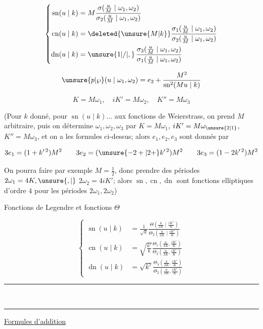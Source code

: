 \[
\left\{\begin{aligned}
\operatorname{sn}(u\mid k)&=M\frac{\sigma(\frac uM\mid\omega_1,\omega_2)}{\sigma_2(\frac uM\mid\omega_1,\omega_2)}\\
\operatorname{cn}(u\mid k)&=\deleted{\unsure{M|k}}\frac{\sigma_1(\frac uM\mid\omega_1,\omega_2)}{\sigma_2(\frac uM\mid\omega_1,\omega_2)}\\
\operatorname{dn}(u\mid k)&=\unsure{1|/|,}\,\frac{\sigma_3(\frac uM\mid\omega_1,\omega_2)}{\sigma_1(\frac uM\mid\omega_1,\omega_2)}
\end{aligned}\right.
\]

\[
\unsure{p|\wp}(u\mid\omega_1,\omega_2)=e_2+\frac{M^2}{\operatorname{sn}^2(Mu\mid k)}
\]

\[
K=M\omega_1,\quad iK'=M\omega_2,\quad K''=M\omega_3
\]

(Pour $k$ donné, pour  $\operatorname{sn}(u\mid k)\ldots$ aux fonctions de Weierstrass, on prend $M$ arbitraire, puis on détermine $\omega_1,\omega_2,\omega_3$ par $K=M\omega_1$, $iK'=M\omega_{\unsure{2|1}}$, $K''=M\omega_3$, et on a les formules ci-dessus;  alors $e_1,e_2,e_3$ sont donnés par

\[
3e_1=(1+k'^{\,2})M^2\qquad
3e_2=(\unsure{-2+|2+}k'^{\,2})M^2\qquad
3e_3=(1-2k'^{\,2})M^2
\]

On pourra faire par exemple $M=\frac12$, donc prendre des périodes  $2\omega_1=4K,\unsure{,|{}}$ $2\omega_2=4iK'$; alors $\operatorname{sn},\operatorname{cn},\operatorname{dn}$ sont fonctions elliptiques d'ordre $4$ pour les périodes $2\omega_1,2\omega_2$)

Fonctions de Legendre et fonctions $\Theta$

\[
\left\{\begin{aligned}
\operatorname{sn}(u\mid k)&=\frac1{\sqrt k}\frac{\Theta(\frac{u}{2K}\mid\frac{iK'}K)}{\Theta_2(\frac{u}{2K}\mid\frac{iK'}K)}\\
\operatorname{cn}(u\mid k)&=\sqrt{\frac{k'}k}\frac{\Theta_1(\frac{u}{2K},\frac{iK'}K)}{\Theta_2(\frac{u}{2K},\frac{iK'}K)}\\
\operatorname{dn}(u\mid k)&=\sqrt{k'}\frac{\Theta_3(\frac{u}{2K},\frac{iK'}K)}{\Theta_2(\frac{u}{2K},\frac{iK'}K)}
\end{aligned}\right.
\]

\begin{center}\rule{.5\linewidth}{.4pt}\\[-.5ex]\rule{.27\linewidth}{.4pt}\end{center}
\uline{Formules d'addition}

